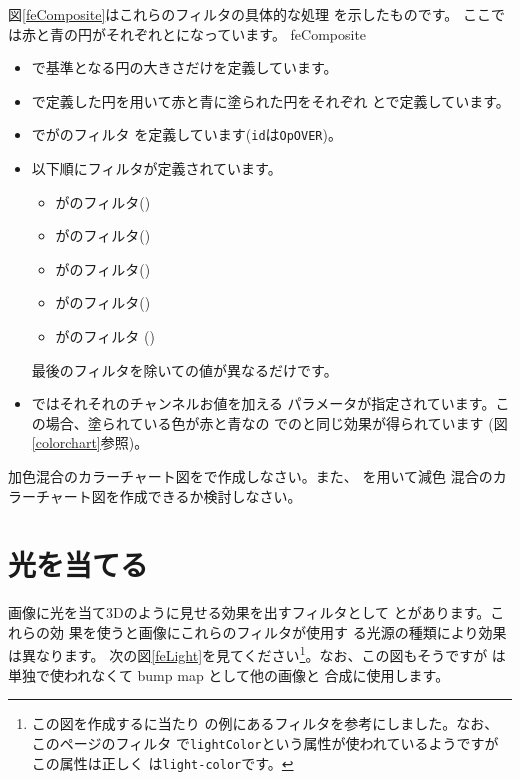   図\ref{feComposite}はこれらのフィルタの具体的な処理
  を示したものです。
  ここでは赤と青の円がそれぞれとになっています。
{feComposite}

\begin{itemize}
 \item {}で基準となる円の大きさだけを定義しています。
 \item {}で定義した円を用いて赤と青に塗られた円をそれぞれ
       とで定義しています。
 \item {}でがのフィルタ
       を定義しています(\texttt{id}は\texttt{OpOVER})。
 \item 以下順にフィルタが定義されています。
\begin{itemize}
 \item {}がのフィルタ()
 \item {}がのフィルタ()
 \item {}がのフィルタ()
 \item {}がのフィルタ()
 \item {}がのフィルタ
       ()
\end{itemize}
最後のフィルタを除いての値が異なるだけです。
 \item {}ではそれそれのチャンネルお値を加える
      パラメータが指定されています。この場合、塗られている色が赤と青なの
       でのと同じ効果が得られています
       (図\ref{colorchart}参照)。
\end{itemize}
\begin{Problem}
加色混合のカラーチャート図をで作成しなさい。また、
を用いて減色
 混合のカラーチャート図を作成できるか検討しなさい。
\end{Problem}
\iffalse\else
\section{光を当てる}
画像に光を当て3Dのように見せる効果を出すフィルタとして
とがあります。これらの効
果を使うと画像にこれらのフィルタが使用す
る光源の種類により効果は異なります。
次の図\ref{feLight}を見てください\footnote{この図を作成するに当たり
の例にあるフィルタを参考にしました。なお、このページのフィルタ
で\texttt{lightColor}という属性が使われているようですがこの属性は正しく
は\texttt{light-color}です。}。なお、この図もそうですが
は単独で使われなくて bump map として他の画像と
合成に使用します。
